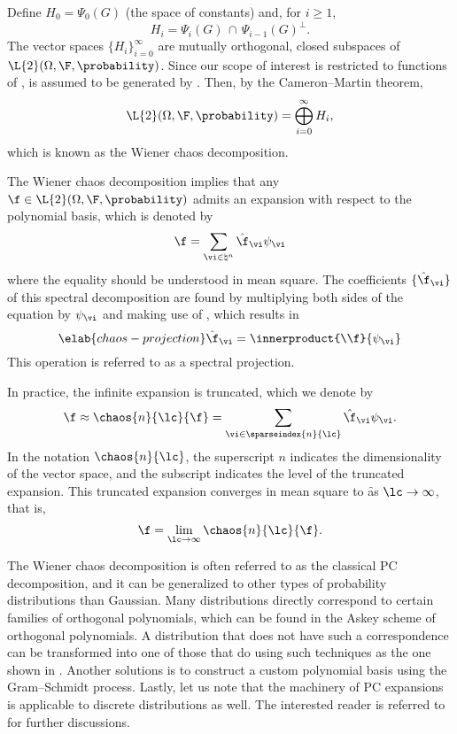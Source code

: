 Define $H_0 = \Psi_0(G)$ (the space of constants) and, for $i \geq 1$,
\[
  H_i = \Psi_i(G) \, \cap \, \Psi_{i - 1}(G)^\perp.
\]
The vector spaces $\{ H_i \}_{i = 0}^\infty$ are mutually orthogonal, closed
subspaces of $\L{2}(\Omega, \F, \probability)$. Since our scope of interest is
restricted to functions of \vx, \F is assumed to be generated by \vx. Then, by
the Cameron--Martin theorem,
\[
  \L{2}(\Omega, \F, \probability) = \bigoplus_{i = 0}^\infty H_i,
\]
which is known as the Wiener chaos decomposition.

The Wiener chaos decomposition implies that any $\f \in \L{2}(\Omega, \F,
\probability)$ admits an expansion with respect to the polynomial basis, which
is denoted by
\[
  \f = \sum_{\vi \in \natural^n} \hat{\f}_{\vi} \psi_{\vi}
\]
where the equality should be understood in mean square. The coefficients $\{
\hat{\f}_{\vi} \}$ of this spectral decomposition are found by multiplying both
sides of the equation by $\psi_{\vi}$ and making use of
, which results in
\begin{equation} \elab{chaos-projection}
  \hat{\f}_{\vi} = \innerproduct{\\f}{\psi_{\vi}}
\end{equation}
This operation is referred to as a spectral projection.

In practice, the infinite expansion is truncated, which we denote by
\[
  \f \approx \chaos{n}{\lc}{\f} = \sum_{\vi \in \sparseindex{n}{\lc}} \hat{\f}_{\vi} \psi_{\vi}.
\]
In the notation $\chaos{n}{\lc}$, the superscript $n$ indicates the
dimensionality of the vector space, and the subscript \lc indicates the level of
the truncated expansion. This truncated expansion converges in mean square to \f
as $\lc \to \infty$, that is,
\[
  \f = \lim_{\lc \to \infty} \chaos{n}{\lc}{\f}.
\]

The Wiener chaos decomposition is often referred to as the classical \ac{PC}
decomposition, and it can be generalized to other types of probability
distributions than Gaussian. Many distributions directly correspond to certain
families of orthogonal polynomials, which can be found in the Askey scheme of
orthogonal polynomials. A distribution that does not have such a correspondence
can be transformed into one of those that do using such techniques as the one
shown in . Another solutions is to construct a
custom polynomial basis using the Gram--Schmidt process. Lastly, let us note
that the machinery of \ac{PC} expansions is applicable to discrete distributions
as well. The interested reader is referred to \cite{xiu2010} for further
discussions.
